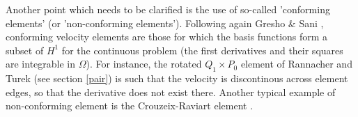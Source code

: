 Another point which needs to be clarified is the use of so-called 'conforming elements' 
(or 'non-conforming elements').  
Following again Gresho \& Sani \cite{grsa}, 
conforming velocity elements are those for which the basis functions form a subset 
of $H^1$ for the continuous problem (the first derivatives and their squares are integrable in $\Omega$).
For instance, the rotated $Q_1 \times P_0$ element of Rannacher and Turek (see section \ref{pair}) is such that 
the velocity is discontinous across element edges, so that the derivative does not exist there. Another
typical example of non-conforming element is the Crouzeix-Raviart element \cite{crra73}.


